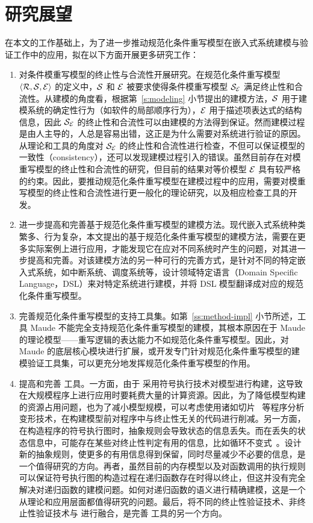 \section{研究展望}

在本文的工作基础上，为了进一步推动规范化条件重写模型在嵌入式系统建模与验证工作中的应用，拟在以下方面开展更多研究工作：

\begin{enumerate}
\item 
对条件模重写模型的终止性与合流性开展研究。在规范化条件重写模型 $\langle \mathcal{R},\mathcal{S},\mathcal{E}\rangle$ 的定义中，$\mathcal{S}$ 和 $\mathcal{E}$ 被要求使得条件模重写模型 $\mathcal{S}_{\mathcal{E}}$ 满足终止性和合流性。从建模的角度看，根据第~\ref{s:modeling} 小节提出的建模方法，$\mathcal{S}$ 用于建模系统的确定性行为（如软件的局部顺序行为），$\mathcal{E}$ 用于描述项表达式的结构信息，因此 $\mathcal{S}_{\mathcal{E}}$ 的终止性和合流性可以由建模的方法得到保证。然而建模过程是由人主导的，人总是容易出错，这正是为什么需要对系统进行验证的原因。从理论和工具的角度对 $\mathcal{S}_{\mathcal{E}}$ 的终止性和合流性进行检查，不但可以保证模型的一致性（consistency），还可以发现建模过程引入的错误。虽然目前存在对模重写模型的终止性和合流性的研究\cite{DBLP:conf/cade/JouannaudM84,DBLP:journals/tcs/JouannaudM92,DBLP:journals/ijsi/JouannaudT08,DBLP:conf/rta/Jouannaud06,DBLP:journals/tcs/JouannaudL12,DBLP:journals/siamcomp/JouannaudK86}，但目前的结果对等价模型 $\mathcal{E}$ 具有较严格的约束。因此，要推动规范化条件重写模型在建模过程中的应用，需要对模重写模型的终止性和合流性进行更一般化的理论研究，以及相应检查工具的开发。
\item
进一步提高和完善基于规范化条件重写模型的建模方法。现代嵌入式系统种类繁多、行为复杂，本文提出的基于规范化条件重写模型的建模方法，需要在更多实际案例上进行应用，才能发现它在应对不同系统时产生的问题，对其进一步提高和完善。对该建模方法的另一种可行的完善方式，是针对不同的特定嵌入式系统，如中断系统、调度系统等，设计领域特定语言（Domain Specific Language，DSL）来对特定系统进行建模，并将 DSL 模型翻译成对应的规范化条件重写模型。
\item 
完善规范化条件重写模型的支持工具集。如第~\ref{ss:method-impl} 小节所述，工具 Maude 不能完全支持规范化条件重写模型的建模，其根本原因在于 Maude 的理论模型——重写逻辑的表达能力不如规范化条件重写模型。因此，对 Maude 的底层核心模块进行扩展，或开发专门针对规范化条件重写模型的建模验证工具集，可以更充分地发挥规范化条件重写模型的作用。
\item 
提高和完善 \CTerm 工具。一方面，由于 \CTerm 采用符号执行技术对模型进行构建，这导致在大规模程序上进行应用时要耗费大量的计算资源。因此，为了降低模型构建的资源占用问题，也为了减小模型规模，可以考虑使用诸如切片~\cite{DBLP:journals/tse/Weiser84} 等程序分析变形技术，在构建模型前对程序中与终止性无关的代码进行削减。另一方面，在构造程序的符号执行图时，抽象规则会导致状态的信息丢失。而在丢失的状态信息中，可能存在某些对终止性判定有用的信息，比如循环不变式~\cite{DBLP:journals/cacm/Hoare69}。设计新的抽象规则，使更多的有用信息得到保留，同时尽量减少不必要的信息，是一个值得研究的方向。再者，虽然目前的内存模型以及对函数调用的执行规则可以保证符号执行图的构造过程在递归函数存在时得以终止，但这并没有完全解决对递归函数的建模问题。如何对递归函数的语义进行精确建模，这是一个从理论和应用层面都值得研究的问题。最后，将不同的终止性验证技术、非终止性验证技术与 \CTerm 进行融合，是完善 \CTerm 工具的另一个方向。
\end{enumerate}